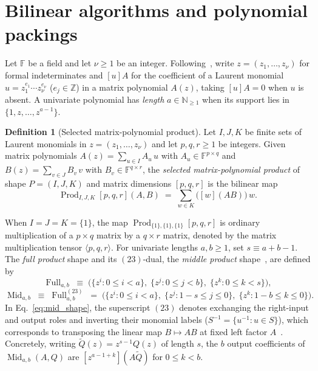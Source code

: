 \documentclass[11pt,a4paper]{article}
\theoremstyle{plain}
\theoremstyle{definition}
\newtheorem{definition}[theorem]{Definition}
\theoremstyle{remark}
\newcommand{\N}{\mathbb{N}}
\newcommand{\Z}{\mathbb{Z}}
\newcommand{\F}{\mathbb{F}}
\DeclareMathOperator{\Full}{Full}
\DeclareMathOperator{\Mid}{Mid}
\DeclareMathOperator{\Prod}{Prod}
\begin{document}
\section{Bilinear algorithms and polynomial packings}
\label{sec:setup}

Let $\F$ be a field and let $\nu \ge 1$ be an integer. Following~\cite{Pass2026,BCS1997}, write $z = (z_1, \dots, z_\nu)$ for formal indeterminates and $[u]A$ for the coefficient of a Laurent monomial $u = z_1^{e_1} \cdots z_\nu^{e_\nu}$ ($e_j \in \Z$) in a matrix polynomial $A(z)$, taking $[u]A = 0$ when $u$ is absent. A univariate polynomial has \emph{length} $a \in \N_{\ge 1}$ when its support lies in $\{1, z, \dots, z^{a-1}\}$.

\begin{definition}[Selected matrix-polynomial product]
\label{def:selected_product}
Let $I, J, K$ be finite sets of Laurent monomials in $z = (z_1, \dots, z_\nu)$ and let $p, q, r \ge 1$ be integers. Given matrix polynomials $A(z) = \sum_{u \in I} A_u \, u$ with $A_u \in \F^{p \times q}$ and $B(z) = \sum_{v \in J} B_v \, v$ with $B_v \in \F^{q \times r}$, the \emph{selected matrix-polynomial product} of shape $P = (I, J, K)$ and matrix dimensions $[p, q, r]$ is the bilinear map
\begin{equation}
    \Prod_{I, J, K}[p, q, r](A, B) \;=\; \sum_{w \in K} \bigl([w](AB)\bigr)\, w .
    \label{eq:selected_product}
\end{equation}
\end{definition}

When $I = J = K = \{1\}$, the map $\Prod_{\{1\},\{1\},\{1\}}[p,q,r]$ is ordinary multiplication of a $p \times q$ matrix by a $q \times r$ matrix, denoted by the matrix multiplication tensor $\langle p, q, r\rangle$. For univariate lengths $a, b \ge 1$, set $s \equiv a + b - 1$. The \emph{full product} shape and its $(23)$-dual, the \emph{middle product} shape~\cite{BLS2003,Pass2026}, are defined by
\begin{equation}
    \Full_{a, b} \;\equiv\; \bigl(\{z^i : 0 \le i < a\},\; \{z^j : 0 \le j < b\},\; \{z^k : 0 \le k < s\}\bigr),
    \label{eq:full_shape}
\end{equation}
\begin{equation}
    \Mid_{a, b} \;\equiv\; \Full_{a, b}^{(23)} \;=\; \bigl(\{z^i : 0 \le i < a\},\; \{z^j : 1 - s \le j \le 0\},\; \{z^k : 1 - b \le k \le 0\}\bigr) .
    \label{eq:mid_shape}
\end{equation}
In Eq.~\eqref{eq:mid_shape}, the superscript $(23)$ denotes exchanging the right-input and output roles and inverting their monomial labels ($S^{-1} = \{u^{-1} : u \in S\}$), which corresponds to transposing the linear map $B \mapsto AB$ at fixed left factor $A$~\cite{BCS1997,BLS2003}. Concretely, writing $\widetilde{Q}(z) = z^{s-1} Q(z)$ of length $s$, the $b$ output coefficients of $\Mid_{a,b}(A, Q)$ are $[z^{a-1+k}](A\widetilde{Q})$ for $0 \le k < b$.
\end{document}
